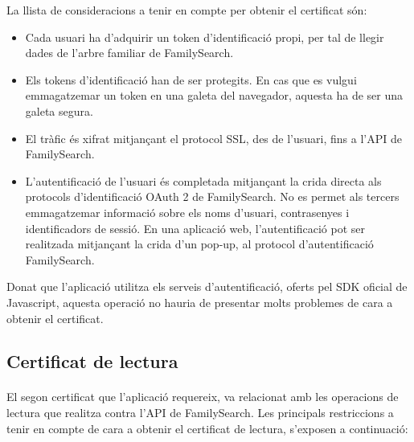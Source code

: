     La llista de consideracions a tenir en compte per obtenir el certificat són:

    \begin{itemize}
        \item Cada usuari ha d'adquirir un token d'identificació propi, per tal de llegir dades de l'arbre familiar de FamilySearch.
        \item Els tokens d'identificació han de ser protegits. En cas que es vulgui emmagatzemar un token en una galeta del navegador, aquesta ha de ser una galeta segura.
        \item El tràfic és xifrat mitjançant el protocol SSL, des de l'usuari, fins a l'API de FamilySearch.
        \item L'autentificació de l'usuari és completada mitjançant la crida directa als protocols d'identificació OAuth 2 de FamilySearch. No es permet als tercers emmagatzemar informació sobre els noms d'usuari, contrasenyes i identificadors de sessió. En una aplicació web, l'autentificació pot ser realitzada mitjançant la crida d'un pop-up, al protocol d'autentificació FamilySearch.
    \end{itemize}

    Donat que l'aplicació utilitza els serveis d'autentificació, oferts pel SDK oficial de Javascript, aquesta operació no hauria de presentar molts problemes de cara a obtenir el certificat.


    \subsection{Certificat de lectura}

    \paragraph{}
    El segon certificat que l'aplicació requereix, va relacionat amb les operacions de lectura que realitza contra l'API de FamilySearch. Les principals restriccions a tenir en compte de cara a obtenir el certificat de lectura, s'exposen a continuació:


